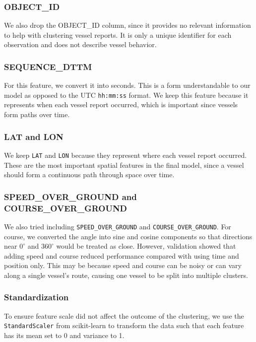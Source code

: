 \documentclass[12pt]{fphw}
\begin{document}
\subsubsection*{OBJECT\_ID} We also drop the OBJECT\_ID column, since it provides no relevant information to help with clustering vessel reports. It is only a unique identifier for each observation and does not describe vessel behavior.

\subsubsection*{SEQUENCE\_DTTM} For this feature, we convert it into seconds. This is a form understandable to our model as opposed to the UTC \texttt{hh:mm:ss} format. We keep this feature because it represents when each vessel report occurred, which is important since vessels form paths over time.

\subsubsection*{LAT and LON} We keep \texttt{LAT} and \texttt{LON} because they represent where each vessel report occurred. These are the most important spatial features in the final model, since a vessel should form a continuous path through space over time.

\subsubsection*{SPEED\_OVER\_GROUND and COURSE\_OVER\_GROUND} We also tried including \texttt{SPEED\_OVER\_GROUND} and \texttt{COURSE\_OVER\_GROUND}. For course, we converted the angle into sine and cosine components so that directions near $0^\circ$ and $360^\circ$ would be treated as close. However, validation showed that adding speed and course reduced performance compared with using time and position only. This may be because speed and course can be noisy or can vary along a single vessel's route, causing one vessel to be split into multiple clusters.

\subsubsection*{Standardization} To ensure feature scale did not affect the outcome of the clustering, we use the \texttt{StandardScaler} from scikit-learn to transform the data such that each feature has its mean set to 0 and variance to 1.
\end{document}
